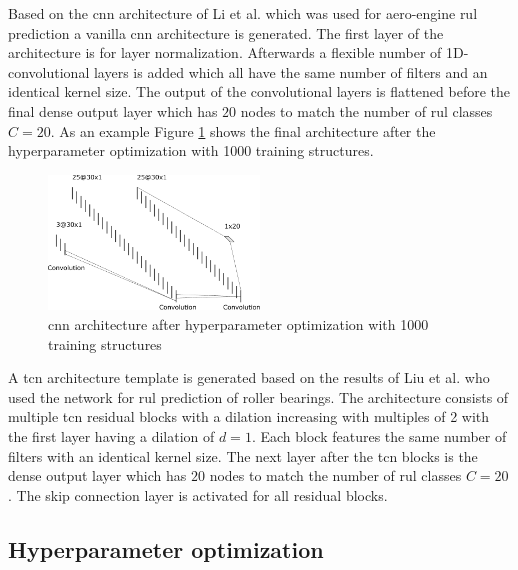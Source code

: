 \documentclass[conference]{IEEEtran}
\begin{document}
Based on the \gls{cnn} architecture of Li et al. \cite{Li2018} which was used for aero-engine \gls{rul} prediction a vanilla \gls{cnn} architecture is generated. The first layer of the architecture is for layer normalization. Afterwards a flexible number of 1D-convolutional layers is added which all have the same number of filters and an identical kernel size. The output of the convolutional layers is flattened before the final dense output layer which has $ 20 $ nodes to match the number of \gls{rul} classes $ C = 20 $. As an example Figure \ref{fig:cnn_architecture_1000_structures} shows the final architecture after the hyperparameter optimization with 1000 training structures.

\begin{figure}[htp]
	\centering
	\includegraphics[width=0.5\textwidth]{cnn_architecture_1000_structures.pdf}
	\caption{\gls{cnn} architecture after hyperparameter optimization with 1000 training structures}
	\label{fig:cnn_architecture_1000_structures}
\end{figure}

A \gls{tcn} architecture template is generated based on the results of Liu et al. \cite{Liu2019} who used the network for \gls{rul} prediction of roller bearings. The architecture consists of multiple \gls{tcn} residual blocks with a dilation increasing with multiples of 2 with the first layer having a dilation of $ d = 1 $. Each block features the same number of filters with an identical kernel size. The next layer after the \gls{tcn} blocks is the dense output layer which has $ 20 $ nodes to match the number of \gls{rul} classes $ C = 20 $. The skip connection layer is activated for all residual blocks.


\noindent
\subsection{Hyperparameter optimization}
\end{document}
